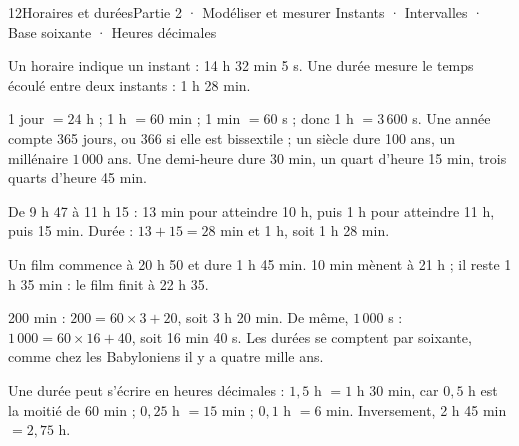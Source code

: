 \begin{ouverture}[grandeurs]{12}{Horaires et durées}{Partie 2 · Modéliser et mesurer}
{Instants · Intervalles · Base soixante · Heures décimales}
\end{ouverture}
\pagestyle{otMain}\essentiel\fontsize{11}{15}\selectfont
{}\label{cours-12-1}
\begin{definition}Un horaire indique un instant : 14 h 32 min 5 s. Une durée mesure le temps écoulé entre deux instants : 1 h 28 min.\end{definition}
\begin{propriete}1 jour $=24$ h ; 1 h $=60$ min ; 1 min $=60$ s ; donc 1 h $=3\,600$ s. Une année compte 365 jours, ou 366 si elle est bissextile ; un siècle dure 100 ans, un millénaire $1\,000$ ans. Une demi-heure dure 30 min, un quart d’heure 15 min, trois quarts d’heure 45 min.\end{propriete}
\begin{savoirfaire}De 9 h 47 à 11 h 15 : 13 min pour atteindre 10 h, puis 1 h pour atteindre 11 h, puis 15 min. Durée : $13+15=28$ min et 1 h, soit 1 h 28 min.\end{savoirfaire}
\label{fig-cours-12-1-cours-frise}

\begin{exemple}Un film commence à 20 h 50 et dure 1 h 45 min. 10 min mènent à 21 h ; il reste 1 h 35 min : le film finit à 22 h 35.\end{exemple}
\clearpage
{}\label{cours-12-2}
\begin{savoirfaire}200 min : $200=60\times3+20$, soit 3 h 20 min. De même, $1\,000$ s : $1\,000=60\times16+40$, soit 16 min 40 s. Les durées se comptent par soixante, comme chez les Babyloniens il y a quatre mille ans.\end{savoirfaire}
\begin{propriete}Une durée peut s’écrire en heures décimales : $1{,}5$ h $=1$ h 30 min, car $0{,}5$ h est la moitié de 60 min ; $0{,}25$ h $=15$ min ; $0{,}1$ h $=6$ min. Inversement, 2 h 45 min $=2{,}75$ h.\end{propriete}
\label{fig-cours-12-2-cours-cadran}

